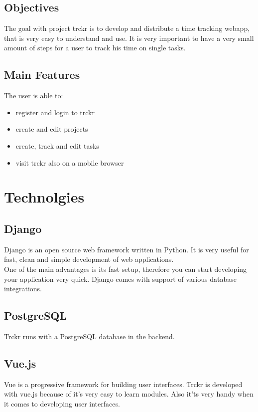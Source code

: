 \documentclass[a4paper, 12pt, headsepline]{scrartcl}
\begin{document}
\subsection{Objectives}
The goal with project trckr is to develop and distribute a time tracking webapp, that is very easy to understand and use. It is very important to
have a very small amount of steps for a user to track his time on single tasks.

\subsection{Main Features}
The user is able to:
\begin{itemize}
    \item register and login to trckr
    \item create and edit projects
    \item create, track and edit tasks
    \item visit trckr also on a mobile browser
\end{itemize}


\section{Technolgies}


\subsection{Django}
Django is an open source web framework written in Python. It is very useful for fast, clean and simple development of web applications.\\
One of the main advantages is its fast setup, therefore you can start developing your application very quick.
Django comes with support of various database integrations.

\subsection{PostgreSQL}
Trckr runs with a PostgreSQL database in the backend.

\subsection{Vue.js}
Vue is a progressive framework for building user interfaces. Trckr is developed with vue.js because of it's
very easy to learn modules. Also it'ts very handy when it comes to developing user interfaces.
\end{document}
